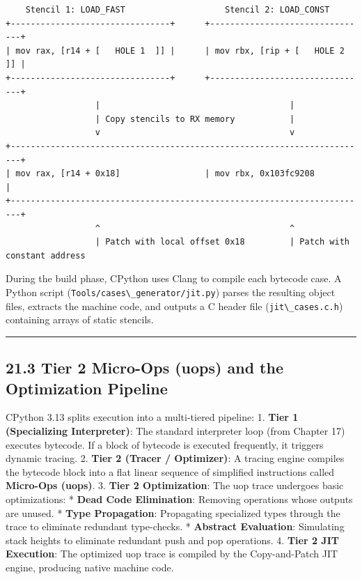 \begin{lstlisting}
    Stencil 1: LOAD_FAST                    Stencil 2: LOAD_CONST
+--------------------------------+      +--------------------------------+
| mov rax, [r14 + [   HOLE 1  ]] |      | mov rbx, [rip + [   HOLE 2  ]] |
+--------------------------------+      +--------------------------------+
                  |                                      |
                  | Copy stencils to RX memory           |
                  v                                      v
+------------------------------------------------------------------------+
| mov rax, [r14 + 0x18]                 | mov rbx, 0x103fc9208           |
+------------------------------------------------------------------------+
                  ^                                      ^
                  | Patch with local offset 0x18         | Patch with constant address
\end{lstlisting}

During the build phase, CPython uses Clang to compile each bytecode
case. A Python script
(\passthrough{\lstinline!Tools/cases\_generator/jit.py!}) parses the
resulting object files, extracts the machine code, and outputs a C
header file (\passthrough{\lstinline!jit\_cases.c.h!}) containing arrays
of static stencils.

\begin{center}\rule{0.5\linewidth}{0.5pt}\end{center}

\hypertarget{tier-2-micro-ops-uops-and-the-optimization-pipeline}{%
\subsection{21.3 Tier 2 Micro-Ops (uops) and the Optimization
Pipeline}\label{tier-2-micro-ops-uops-and-the-optimization-pipeline}}

CPython 3.13 splits execution into a multi-tiered pipeline: 1.
\textbf{Tier 1 (Specializing Interpreter)}: The standard interpreter
loop (from Chapter 17) executes bytecode. If a block of bytecode is
executed frequently, it triggers dynamic tracing. 2. \textbf{Tier 2
(Tracer / Optimizer)}: A tracing engine compiles the bytecode block into
a flat linear sequence of simplified instructions called
\textbf{Micro-Ops (uops)}. 3. \textbf{Tier 2 Optimization}: The uop
trace undergoes basic optimizations: * \textbf{Dead Code Elimination}:
Removing operations whose outputs are unused. * \textbf{Type
Propagation}: Propagating specialized types through the trace to
eliminate redundant type-checks. * \textbf{Abstract Evaluation}:
Simulating stack heights to eliminate redundant push and pop operations.
4. \textbf{Tier 2 JIT Execution}: The optimized uop trace is compiled by
the Copy-and-Patch JIT engine, producing native machine code.

